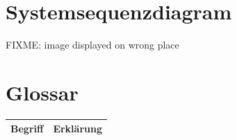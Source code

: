 \documentclass[a4paper,10pt,xetex]{article}
\begin{document}
\section{Systemsequenzdiagram}\label{systemsequenzdiagram}
FIXME: image displayed on wrong place



\section{Glossar}\label{glossar}
\begin{longtabu} to \textwidth { | l | X[l] | }
\hline
\textbf{Begriff} & \textbf{Erklärung}\\\hline
\endhead


\end{longtabu}
\end{document}
